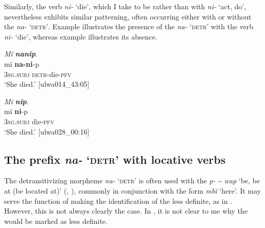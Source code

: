 Similarly, the verb \textit{ni-} ‘die’, which I take to be  rather than  with \textit{ni-} ‘act, do’, nevertheless exhibits similar patterning, often occurring either with or without the  \textit{na-} \textsc{‘detr’}. Example  illustrates the presence of the  \textit{na-} \textsc{‘detr’} with the verb \textit{ni-} ‘die’, whereas example  illustrates its absence.


\ea%
    \label{ex:syntax:321}
          \textit{Mï} \textbf{\textit{nanip}}.\\
\gll mï      \textbf{na-ni}{}-p\\
    3\textsc{sg.subj}  \textsc{detr-}die-\textsc{pfv}\\
\glt `She died.’ [ulwa014\_43:05]
\z

\ea%
    \label{ex:syntax:322}
          \textit{Mï} \textbf{\textit{nip}}.\\
\gll mï      \textbf{ni}{}-p\\
    3\textsc{sg.subj}  die-\textsc{pfv}\\
\glt `She died.’ [ulwa028\_00:16]
\z

\subsection{The prefix \textit{na-} ‘\textsc{detr}’ with locative verbs}\label{sec:13.8.5}


The detransitivizing morpheme \textit{na-} \textsc{‘detr’} is often used with the  \textit{p-} {\textasciitilde} \textit{wap} ‘be, be at (be located at)’ (, ), commonly in conjunction with the form \textit{mbï} ‘here’. It may serve the function of making the identification of the  less definite, as in . However, this is not always clearly the case. In , it is not clear to me why the  would be marked as less definite.


